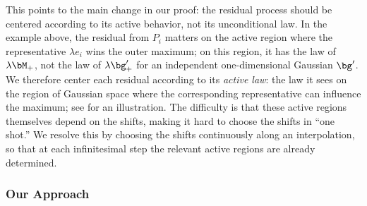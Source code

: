 \documentclass[11pt]{article}
\begin{document}
This points to the main change in our proof: the residual process should be centered according to its active behavior, not its unconditional law. 
In the example above, the residual from $P_i$ matters on the active region where the representative $\lambda e_i$ wins the outer maximum; on this region, it has the law of $\lambda\bM_+$, not the law of $\lambda\bg'_+$ for an independent one-dimensional Gaussian $\bg'$. 
We therefore center each residual according to its \emph{active law}: the law it sees on the region of Gaussian space where the corresponding representative can influence the maximum; see  for an illustration. 
The difficulty is that these active regions themselves depend on the shifts, making it hard to choose the shifts in ``one shot.''  
We resolve this by choosing the shifts continuously along an interpolation, so that at each infinitesimal step the relevant active regions are already determined. 

\subsubsection{Our Approach} 
\label{subsubsec:our-approach}
\end{document}
